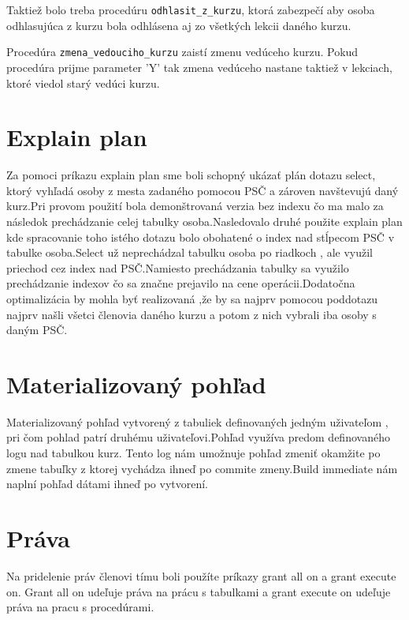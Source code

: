 \documentclass[11pt]{article}
\begin{document}
Taktiež bolo treba procedúru \texttt{odhlasit\_z\_kurzu}, ktorá zabezpečí 
aby osoba odhlasujúca z kurzu bola odhlásena aj zo všetkých lekcii daného kurzu. 

Procedúra \texttt{zmena\_vedouciho\_kurzu} zaistí zmenu vedúceho kurzu. Pokud procedúra prijme parameter 'Y'
tak zmena vedúceho nastane taktiež v lekciach, ktoré viedol starý vedúci kurzu.

\section{Explain plan}
Za pomoci príkazu explain plan sme boli schopný ukázať plán dotazu select, ktorý vyhľadá osoby z mesta zadaného pomocou PSČ
a zároven navštevujú daný kurz.Pri provom použití bola demonštrovaná verzia bez indexu čo ma malo za následok prechádzanie celej tabulky osoba.Nasledovalo druhé použite explain plan kde spracovanie toho istého dotazu bolo obohatené o index nad stĺpecom PSČ v tabulke osoba.Select už neprechádzal tabulku osoba po riadkoch , ale využil priechod cez index nad PSČ.Namiesto prechádzania tabulky sa využilo prechádzanie indexov čo sa značne prejavilo na cene operácii.Dodatočna optimalizácia by mohla byť realizovaná ,že by sa najprv pomocou poddotazu najprv našli všetci členovia daného kurzu a potom z nich vybrali iba osoby s daným PSČ.

\section{Materializovaný pohľad}
Materializovaný pohľad vytvorený z tabuliek definovaných jedným uživateľom , pri čom pohlad patrí druhému uživateľovi.Pohľad využíva predom definovaného logu nad tabulkou kurz.
Tento log nám umožnuje pohľad zmeniť okamžite po zmene tabuľky z ktorej vychádza ihneď po commite zmeny.Build immediate nám naplní pohľad dátami ihneď po vytvorení.


\section{Práva}
Na pridelenie práv členovi tímu boli použíte príkazy grant all on a grant execute on.
Grant all on udeľuje práva na prácu s tabulkami a grant execute on udeľuje práva na pracu s procedúrami.
\end{document}
